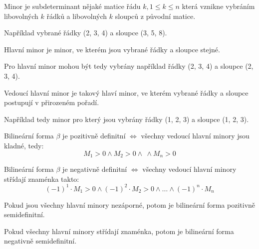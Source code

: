 \begin{definition}[Minor]
    Minor je subdeterminant nějaké matice řádu $k, 1 \leq k \leq n$ která vznikne vybráním
    libovolných $k$ řádků a libovolných $k$ sloupců z původní matice.

    Například vybrané řádky (2, 3, 4) a sloupce (3, 5, 8).
\end{definition}

\begin{definition}
    Hlavní minor je minor, ve kterém jsou vybrané řádky a sloupce stejné.

    Pro hlavní minor mohou být tedy vybrány například řádky (2, 3, 4) a sloupce (2, 3, 4).
\end{definition}

\begin{definition}
    Vedoucí hlavní minor je takový hlaví minor, ve kterém vybrané řádky a sloupce
    postupují v přirozeném pořadí.

    Například tedy minor pro který jsou vybrány řádky (1, 2, 3) a sloupce (1, 2, 3).
\end{definition}

\begin{theorem}
    Bilineární forma $\beta$ je pozitivně definitní $\Leftrightarrow$ všechny
    vedoucí hlavní minory jsou kladné, tedy:
    $$M_1 > 0 \wedge M_2 > 0 \wedge \ \wedge M_n > 0$$

    Bilineární forma $\beta$ je negativně definitní $\Leftrightarrow$ všechny
    vedoucí hlavní minory střídají znaménka takto:
    $$(-1)^1\cdot M_1 > 0 \wedge (-1)^2 \cdot M_2 > 0 \wedge \ldots \wedge (-1)^n \cdot M_n$$
\end{theorem}

Pokud jsou všechny hlavní minory nezáporné, potom je bilineární forma pozitivně semidefinitní.

Pokud všechny hlavní minory střídají znaménka, potom je bilineární forma negativně semidefinitní.

